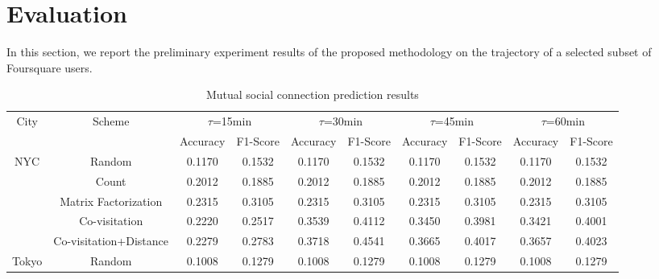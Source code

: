 \section{Evaluation} \label{sec:evaluation}

In this section, we report the preliminary experiment results of the proposed methodology on the trajectory of a selected subset of Foursquare users.


\begin{table*}[]
\centering
\caption{Mutual social connection prediction results}
\label{T1}
\begin{tabular}{|c|c|c|c|c|c|c|c|c|c|}
\hline
\multirow{2}{*}{City}  & \multirow{2}{*}{Scheme} & \multicolumn{2}{c|}{$\tau$=15min} & \multicolumn{2}{c|}{$\tau$=30min} & \multicolumn{2}{c|}{$\tau$=45min} & \multicolumn{2}{c|}{$\tau$=60min} \\ \cline{3-10} 
                       &                         & Accuracy      & F1-Score     & Accuracy      & F1-Score     & Accuracy      & F1-Score     & Accuracy      & F1-Score     \\ \hline
\multirow{5}{*}{NYC}   & Random                  & 0.1170        & 0.1532       & 0.1170        & 0.1532       & 0.1170        & 0.1532       & 0.1170        & 0.1532       \\ \cline{2-10} 
                       & Count                   & 0.2012        & 0.1885       & 0.2012        & 0.1885       & 0.2012        & 0.1885       & 0.2012        & 0.1885       \\ \cline{2-10} 
                       & Matrix Factorization    & 0.2315        & 0.3105       & 0.2315        & 0.3105       & 0.2315        & 0.3105       & 0.2315        & 0.3105       \\ \cline{2-10} 
                       & Co-visitation           & 0.2220        & 0.2517       & 0.3539        & 0.4112       & 0.3450        & 0.3981       & 0.3421        & 0.4001       \\ \cline{2-10} 
                       & Co-visitation+Distance  & 0.2279        & 0.2783       & 0.3718        & 0.4541       & 0.3665        & 0.4017       & 0.3657        & 0.4023       \\ \hline
\multirow{5}{*}{Tokyo} & Random                  & 0.1008        & 0.1279       & 0.1008        & 0.1279       & 0.1008        & 0.1279       & 0.1008        & 0.1279       \\ \cline{2-10} 

\end{tabular}
\end{table*}

